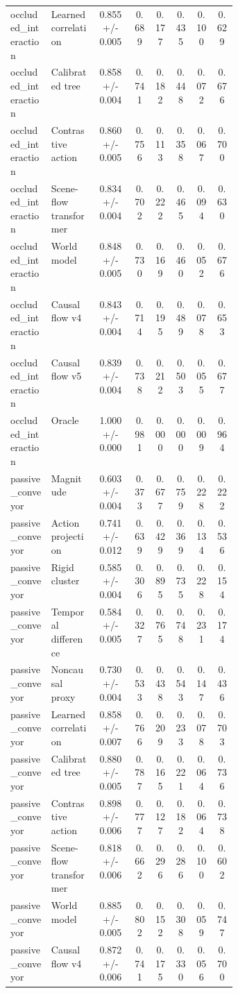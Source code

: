 \documentclass{article}
\begin{document}
\begin{center}
\begin{longtable}{p{0.18\linewidth}p{0.20\linewidth}cccccc}
occluded\_interaction & Learned correlation & 0.855 +/- 0.005 & 0.689 & 0.177 & 0.435 & 0.100 & 0.629\\
occluded\_interaction & Calibrated tree & 0.858 +/- 0.004 & 0.741 & 0.182 & 0.448 & 0.072 & 0.676\\
occluded\_interaction & Contrastive action & 0.860 +/- 0.005 & 0.756 & 0.113 & 0.358 & 0.067 & 0.700\\
occluded\_interaction & Scene-flow transformer & 0.834 +/- 0.004 & 0.702 & 0.222 & 0.465 & 0.094 & 0.630\\
occluded\_interaction & World model & 0.848 +/- 0.005 & 0.730 & 0.169 & 0.460 & 0.052 & 0.676\\
occluded\_interaction & Causal flow v4 & 0.843 +/- 0.004 & 0.714 & 0.195 & 0.489 & 0.078 & 0.653\\
occluded\_interaction & Causal flow v5 & 0.839 +/- 0.004 & 0.738 & 0.212 & 0.503 & 0.055 & 0.677\\
occluded\_interaction & Oracle & 1.000 +/- 0.000 & 0.981 & 0.000 & 0.000 & 0.009 & 0.964\\
passive\_conveyor & Magnitude & 0.603 +/- 0.004 & 0.373 & 0.677 & 0.759 & 0.228 & 0.222\\
passive\_conveyor & Action projection & 0.741 +/- 0.012 & 0.639 & 0.429 & 0.369 & 0.134 & 0.536\\
passive\_conveyor & Rigid cluster & 0.585 +/- 0.004 & 0.306 & 0.895 & 0.735 & 0.228 & 0.154\\
passive\_conveyor & Temporal difference & 0.584 +/- 0.005 & 0.327 & 0.765 & 0.748 & 0.231 & 0.174\\
passive\_conveyor & Noncausal proxy & 0.730 +/- 0.004 & 0.533 & 0.438 & 0.543 & 0.147 & 0.436\\
passive\_conveyor & Learned correlation & 0.858 +/- 0.007 & 0.766 & 0.209 & 0.233 & 0.078 & 0.703\\
passive\_conveyor & Calibrated tree & 0.880 +/- 0.005 & 0.787 & 0.165 & 0.221 & 0.064 & 0.736\\
passive\_conveyor & Contrastive action & 0.898 +/- 0.006 & 0.777 & 0.127 & 0.182 & 0.064 & 0.738\\
passive\_conveyor & Scene-flow transformer & 0.818 +/- 0.006 & 0.662 & 0.296 & 0.286 & 0.100 & 0.602\\
passive\_conveyor & World model & 0.885 +/- 0.005 & 0.802 & 0.152 & 0.308 & 0.059 & 0.747\\
passive\_conveyor & Causal flow v4 & 0.872 +/- 0.006 & 0.741 & 0.175 & 0.330 & 0.056 & 0.700\\

\end{longtable}
\end{center}
\end{document}
